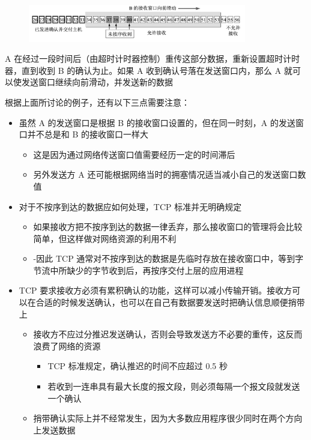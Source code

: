 \documentclass[cs4size,a4paper,10pt]{ctexart}
\begin{document}
	\begin{figure}[H]
		\centering
		\includegraphics[width=0.85\textwidth]{img/5.17.2}
	\end{figure}

	A 在经过一段时间后（由超时计时器控制）重传这部分数据，重新设置超时计时器，直到收到 B 的确认为止。如果 A 收到确认号落在发送窗口内，那么 A 就可以使发送窗口继续向前滑动，并发送新的数据

	根据上面所讨论的例子，还有以下三点需要注意：
	\begin{itemize}
		\item 虽然 A 的发送窗口是根据 B 的接收窗口设置的，但在同一时刻，A 的发送窗口并不总是和 B 的接收窗口一样大
		\begin{itemize}
			\item 这是因为通过网络传送窗口值需要经历一定的时间滞后
			\item 另外发送方 A 还可能根据网络当时的拥塞情况适当减小自己的发送窗口数值
		\end{itemize}
		\item 对于不按序到达的数据应如何处理，TCP 标准并无明确规定
		\begin{itemize}
			\item 如果接收方把不按序到达的数据一律丢弃，那么接收窗口的管理将会比较简单，但这样做对网络资源的利用不利
			\item -因此 TCP 通常对不按序到达的数据是先临时存放在接收窗口中，等到字节流中所缺少的字节收到后，再按序交付上层的应用进程
		\end{itemize}
		\item TCP 要求接收方必须有累积确认的功能，这样可以减小传输开销。接收方可以在合适的时候发送确认，也可以在自己有数据要发送时把确认信息顺便捎带上
		\begin{itemize}
			\item 接收方不应过分推迟发送确认，否则会导致发送方不必要的重传，这反而浪费了网络的资源
			\begin{itemize}
				\item TCP 标准规定，确认推迟的时间不应超过 0.5 秒
				\item 若收到一连串具有最大长度的报文段，则必须每隔一个报文段就发送一个确认
			\end{itemize}
			\item 捎带确认实际上并不经常发生，因为大多数应用程序很少同时在两个方向上发送数据
		\end{itemize}
	\end{itemize}
\end{document}
